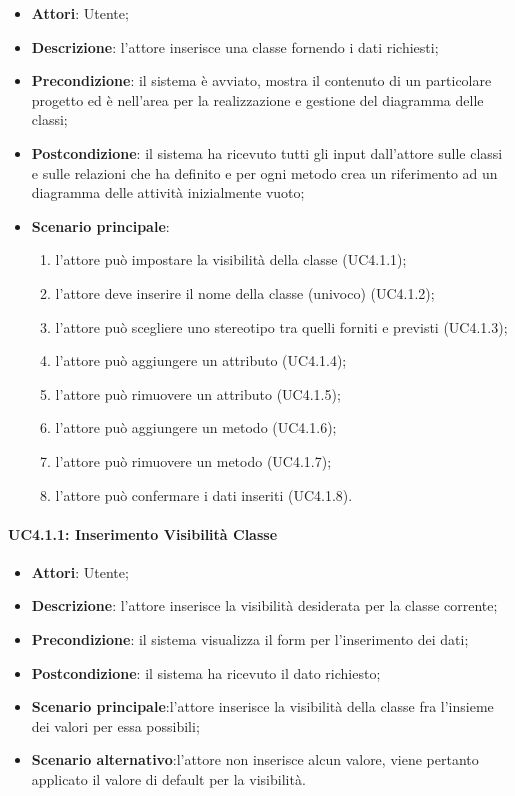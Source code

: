 \begin{itemize}
\item \textbf{Attori}: Utente;
\item \textbf{Descrizione}: l'attore inserisce una classe fornendo i dati richiesti;
\item \textbf{Precondizione}: il sistema è avviato, mostra il contenuto di un particolare progetto ed è nell'area per la realizzazione e gestione del diagramma delle classi;
\item \textbf{Postcondizione}: il sistema ha ricevuto tutti gli input dall'attore sulle classi e sulle relazioni che ha definito e per ogni metodo crea un riferimento ad un diagramma delle attività inizialmente vuoto;
\item \textbf{Scenario principale}:
	\begin{enumerate}
		\item l'attore può impostare la visibilità della classe (UC4.1.1);
		\item l'attore deve inserire il nome della classe (univoco) (UC4.1.2);
		\item l'attore può scegliere uno stereotipo tra quelli forniti e previsti (UC4.1.3);
		\item l'attore può aggiungere un attributo (UC4.1.4);
		\item l'attore può rimuovere un attributo (UC4.1.5);
		\item l'attore può aggiungere un metodo (UC4.1.6);
		\item l'attore può rimuovere un metodo (UC4.1.7);

		\item l'attore può confermare i dati inseriti (UC4.1.8).
	\end{enumerate}
\end{itemize}

\paragraph{UC4.1.1: Inserimento Visibilità Classe}
\label{UC4.1.1}

\begin{itemize}
\item \textbf{Attori}: Utente;
\item \textbf{Descrizione}: l'attore inserisce la visibilità desiderata per la classe corrente;
\item \textbf{Precondizione}: il sistema visualizza il form per l'inserimento dei dati;
\item \textbf{Postcondizione}: il sistema ha ricevuto il dato richiesto;
\item \textbf{Scenario principale}:l'attore inserisce la visibilità della classe fra l'insieme dei valori per essa possibili;
\item \textbf{Scenario alternativo}:l'attore non inserisce alcun valore, viene pertanto applicato il valore di default per la visibilità.
\end{itemize}


